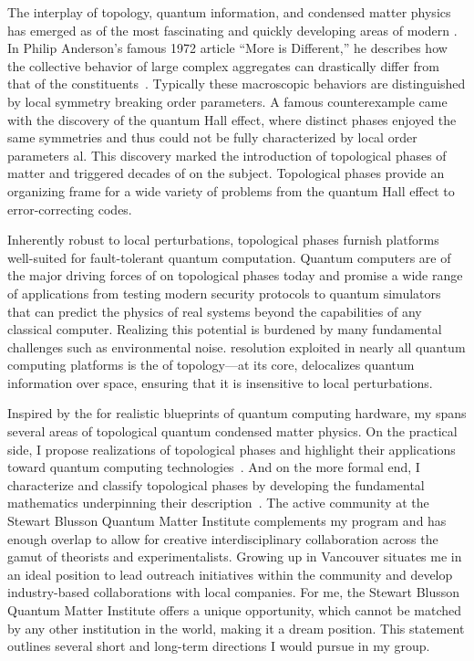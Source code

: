 The interplay of topology, quantum information, and condensed matter physics has emerged as  of the most fascinating and quickly developing areas of modern . 
In Philip Anderson's famous 1972 article ``More is Different,'' he describes how the collective behavior of large complex aggregates can drastically differ from that of the constituents~\cite{Anderson72}. 
Typically these macroscopic behaviors are distinguished by local symmetry breaking order parameters.
A famous counterexample came with the discovery of the quantum Hall effect, where distinct phases enjoyed the same symmetries and thus could not be fully characterized by local order parameters al.
This discovery marked the introduction of topological phases of matter and triggered decades of  on the subject.
Topological phases provide an organizing frame for a wide variety of problems from the quantum Hall effect to error-correcting codes.

Inherently robust to local perturbations, topological phases furnish platforms well-suited for fault-tolerant quantum computation.
Quantum computers are  of the major driving forces of  on topological phases today and promise a wide range of applications from testing modern security protocols to quantum simulators that can predict the physics of real systems beyond the capabilities of any classical computer.
Realizing this potential is burdened by many fundamental challenges such as environmental noise.
 resolution exploited in nearly all quantum computing platforms is the  of topology---at its core,  delocalizes quantum information over space, ensuring that it is insensitive to local perturbations.



{
Inspired by the  for realistic blueprints of quantum computing hardware, my  spans several areas of topological quantum condensed matter physics. On the practical side, I propose realizations of topological phases and highlight their applications toward quantum computing technologies~\cite{Aasen2016,Aasen20,Slagle2019,Klocke2020}. And on the more formal end, I characterize and classify topological phases by developing the fundamental mathematics underpinning their description~\cite{ALM,Aasen2020SPT,Aasen2020defect}. 
The active  community at the Stewart Blusson Quantum Matter Institute complements my  program and has enough overlap to allow for creative interdisciplinary collaboration across the gamut of theorists and experimentalists.
Growing up in Vancouver situates me in an ideal position to lead outreach initiatives within the community and develop industry-based  collaborations with local companies. For me, the Stewart Blusson Quantum Matter Institute offers a unique opportunity, which cannot be matched by any other institution in the world, making it a dream position.
This  statement outlines several short and long-term  directions I would pursue in my group. 
}


